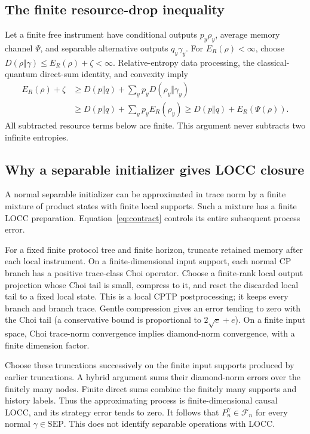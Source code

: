 \documentclass[11pt,a4paper]{article}
\numberwithin{equation}{section}
\theoremstyle{remark}
\newcommand{\SEP}{\mathrm{SEP}}
\newcommand{\ER}{E_R}
\begin{document}
\subsection{The finite resource-drop inequality}
Let a finite free instrument have conditional outputs \(p_y\rho_y\),
average memory channel \(\Psi\), and separable alternative outputs
\(q_y\gamma_y\). For \(\ER(\rho)<\infty\), choose
\(D(\rho\Vert\gamma)\leq\ER(\rho)+\zeta<\infty\).
Relative-entropy data processing, the classical-quantum direct-sum identity,
and convexity imply
\begin{align}
 \ER(\rho)+\zeta
 &\geq D(p\Vert q)+\sum_y p_y D(\rho_y\Vert\gamma_y) \nonumber\\
 &\geq D(p\Vert q)+\sum_y p_y\ER(\rho_y)
 \geq D(p\Vert q)+\ER(\Psi(\rho)).               \label{eq:drop}
\end{align}
All subtracted resource terms below are finite. This argument never
subtracts two infinite entropies.

\subsection{Why a separable initializer gives LOCC closure}
A normal separable initializer can be approximated in trace norm by a
finite mixture of product states with finite local supports. Such a
mixture has a finite LOCC preparation. Equation~\eqref{eq:contract}
controls its entire subsequent process error.

For a fixed finite protocol tree and finite horizon, truncate retained
memory after each local instrument. On a finite-dimensional input support,
each normal CP branch has a positive trace-class Choi operator. Choose
a finite-rank local output projection whose Choi tail is small, compress
to it, and reset the discarded local tail to a fixed local state. This is
a local CPTP postprocessing; it keeps every branch and branch trace.
Gentle compression gives an error tending to zero with the Choi tail
(a conservative bound is proportional to \(2\sqrt e+e\)).
On a finite input space, Choi trace-norm convergence implies diamond-norm
convergence, with a finite dimension factor.

Choose these truncations successively on the finite input supports produced
by earlier truncations. A hybrid argument sums their diamond-norm errors
over the finitely many nodes. Finite direct sums combine the finitely many
supports and history labels. Thus the approximating process is
finite-dimensional causal LOCC, and its strategy error tends to zero.
It follows that \(P_n^\gamma\in\mathcal F_n\) for every normal
\(\gamma\in\SEP\). This does not identify separable operations with LOCC.
\end{document}
